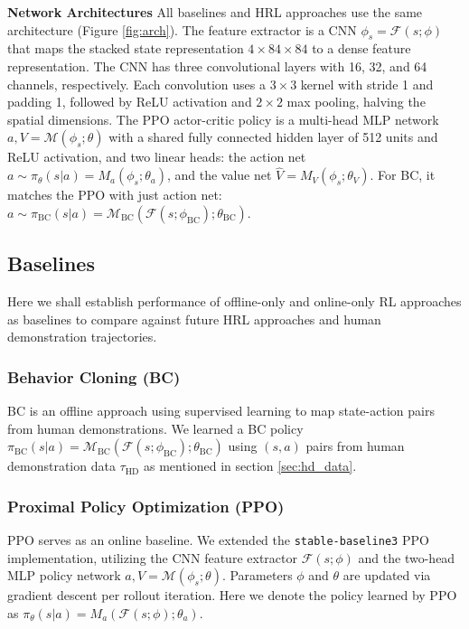 \documentclass{article}
\begin{document}
\textbf{Network Architectures}
All baselines and HRL approaches use the same architecture 
(Figure \ref{fig:arch}). The feature extractor is a CNN 
$\phi_s = \mathcal{F}(s;\phi)$ that maps the stacked state 
representation \(4 \times 84 \times 84\) to a dense feature 
representation. The CNN has three convolutional layers with 16, 32, 
and 64 channels, respectively. Each convolution uses a \(3 \times 3\) 
kernel with stride 1 and padding 1, followed by ReLU activation and 
\(2 \times 2\) max pooling, halving the spatial dimensions. 
The PPO actor-critic policy 
is a multi-head MLP network $a, V = \mathcal{M}(\phi_s; \theta)$ with a 
shared fully connected hidden layer of 512 units and 
ReLU activation, and two linear heads:
the action net $a \sim \pi_\theta(s|a) = M_a(\phi_s;\theta_a)$,
and the value net ${\hat V} = M_V(\phi_s;\theta_V)$.
For BC, it matches the PPO with just action net:
$a \sim \pi_{\text{BC}}(s|a) =
\mathcal{M}_{\text{BC}}(\mathcal{F}(s;\phi_{\text{BC}});\theta_{\text{BC}})$.


\subsection{Baselines}
Here we shall establish performance of offline-only and online-only RL approaches
as baselines to compare against future HRL approaches and human demonstration trajectories. 

\subsubsection{Behavior Cloning (BC)} 
BC is an offline approach using supervised 
learning to map state-action pairs from human demonstrations. We learned 
a BC policy $\pi_{\text{BC}}(s|a) =
\mathcal{M}_{\text{BC}}(\mathcal{F}(s;\phi_{\text{BC}});\theta_{\text{BC}})$
using $(s,a)$ pairs from human demonstration data $\tau_{\text{HD}}$ as mentioned
in section \ref{sec:hd_data}.

\subsubsection{Proximal Policy Optimization (PPO)} 
PPO serves as an online baseline. We extended the 
\texttt{stable-baseline3} PPO implementation, utilizing the 
CNN feature extractor $\mathcal{F}(s;\phi)$ and the two-head 
MLP policy network $a, V = \mathcal{M}(\phi_s; \theta)$. 
Parameters $\phi$ and $\theta$ are updated via gradient 
descent per rollout iteration.
Here we denote the policy learned by PPO as 
$\pi_\theta(s|a) = M_a(\mathcal{F}(s;\phi);\theta_a)$.
\end{document}
